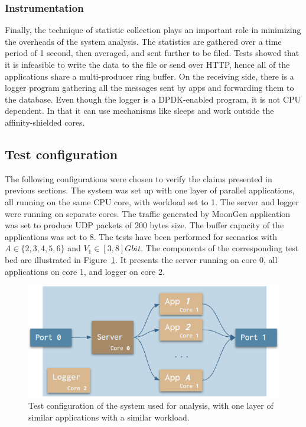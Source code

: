 \documentclass[english]{kththesis}
\begin{document}
\subsubsection{Instrumentation}
Finally, the technique of statistic collection plays an important role in minimizing the overheads of the system analysis. The statistics are gathered over a time period of 1 second, then averaged, and sent further to be filed. Tests showed that it is infeasible to write the data to the file or send over HTTP, hence all of the applications share a multi-producer ring buffer. On the receiving side, there is a logger program gathering all the messages sent by apps and forwarding them to the database. Even though the logger is a DPDK-enabled program, it is not CPU dependent. In that it can use mechanisms like sleeps and work outside the affinity-shielded cores.

\subsection{Test configuration}
The following configurations were chosen to verify the claims presented in previous sections. The system was set up with one layer of parallel applications, all running on the same CPU core, with workload set to 1. The server and logger were running on separate cores. The traffic generated by MoonGen application was set to produce UDP packets of 200 bytes size. The buffer capacity of the applications was set to 8. The tests have been performed for scenarios with \(A \in \{2,3,4,5,6\}\) and \(V_1 \in [3,8] Gbit\). The components of the corresponding test bed are illustrated in Figure~\ref{fig:testbed}. It presents the server running on core 0, all applications on core 1, and logger on core 2.

\begin{figure}[t]
  \centering
    \includegraphics[width=1\textwidth]{Fig15.png}
  \caption{Test configuration of the system used for analysis, with one layer of similar applications with a  similar workload.}
  \label{fig:testbed}
\end{figure}
\end{document}
